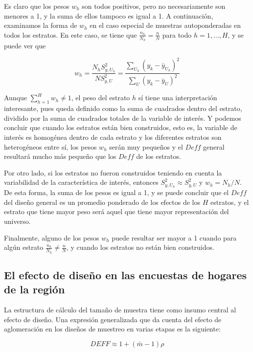 \documentclass[
  10pt,
  spanish,
]{book}
\begin{document}
Es claro que los pesos \(w_h\) son todos positivos, pero no necesariamente son menores a 1, y la suma de ellos tampoco es igual a 1. A continuación, examinamos la forma de \(w_h\) en el caso especial de muestras autoponderadas en todos los estratos. En este caso, se tiene que \(\frac{n_h}{N_h}=\frac{n}{N}\) para todo \(h=1,\ldots,H\), y se puede ver que

\[
w_h=\frac{N_hS_{y,U_h}^2}{NS_{y,U}^2}=\frac{\sum_{U_h}{(y_k-{\bar{y}}_{U_h})}^2}{\sum_{U}{(y_k-{\bar{y}}_U)}^2}
\]

Aunque \(\sum_{h=1}^{H}w_h\neq 1\), el peso del estrato \(h\) sí tiene una interpretación interesante, pues queda definido como la suma de cuadrados dentro del estrato, dividido por la suma de cuadrados totales de la variable de interés. Y podemos concluir que cuando los estratos están bien construidos, esto es, la variable de interés es homogénea dentro de cada estrato y los diferentes estratos son heterogéneos entre sí, los pesos \(w_h\) serán muy pequeños y el \(Deff\) general resultará mucho más pequeño que los \(Deff\) de los estratos.

Por otro lado, si los estratos no fueron construidos teniendo en cuenta la variabilidad de la característica de interés, entonces \(S_{y,U_h}^2\approx S_{y,U}^2\) y \(w_h=N_h/N\). De esta forma, la suma de los pesos es igual a 1, y se puede concluir que el \(Deff\) del diseño general es un promedio ponderado de los efectos de los \(H\) estratos, y el estrato que tiene mayor peso será aquel que tiene mayor representación del universo.

Finalmente, alguno de los pesos \(w_h\) puede resultar ser mayor a 1 cuando para algún estrato \(\frac{n_h}{N_h}\neq\frac{n}{N}\), y cuando los estratos no están bien construidos.

\hypertarget{el-efecto-de-diseuxf1o-en-las-encuestas-de-hogares-de-la-regiuxf3n}{%
\subsection{El efecto de diseño en las encuestas de hogares de la región}\label{el-efecto-de-diseuxf1o-en-las-encuestas-de-hogares-de-la-regiuxf3n}}

La estructura de cálculo del tamaño de muestra tiene como insumo central al efecto de diseño. Una expresión generalizada que da cuenta del efecto de aglomeración en los diseños de muestreo en varias etapas \citep{Park_Lee_2006} es la siguiente:

\[
DEFF \approx 1 + (\bar{m} - 1)\rho
\]
\end{document}
